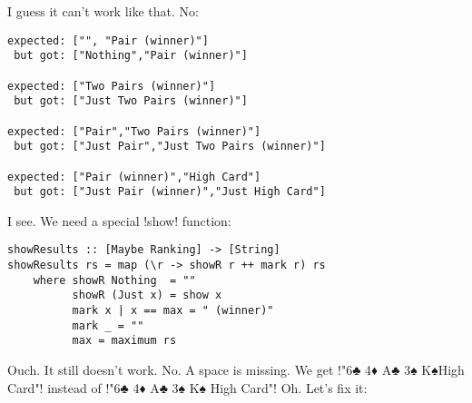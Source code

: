 \failure I guess it can't work like that.
\lhN No:
\begin{small}
\begin{verbatim}
expected: ["", "Pair (winner)"]
 but got: ["Nothing","Pair (winner)"]

expected: ["Two Pairs (winner)"]
 but got: ["Just Two Pairs (winner)"]

expected: ["Pair","Two Pairs (winner)"]
 but got: ["Just Pair","Just Two Pairs (winner)"]

expected: ["Pair (winner)","High Card"]
 but got: ["Just Pair (winner)","Just High Card"]
\end{verbatim}
\end{small}
\lhA I see. We need a special \il!show! function:
\begin{lstlisting}[frame=single]
showResults :: [Maybe Ranking] -> [String]
showResults rs = map (\r -> showR r ++ mark r) rs
    where showR Nothing  = ""
          showR (Just x) = show x 
          mark x | x == max = " (winner)"
          mark _ = ""
          max = maximum rs
\end{lstlisting}
\failure Ouch. It still doesn't work.
\lhN No. A space is missing. We get 
\il!"6♣ 4♦ A♣ 3♠ K♠High Card"! instead of \il!"6♣ 4♦ A♣ 3♠ K♠ High Card"!
\lhA \failure Oh. Let's fix it:

\lhend
